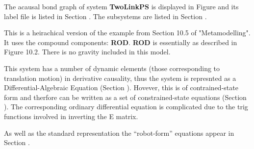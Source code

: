 
%

   The acausal bond graph of system \textbf{TwoLinkPS} is
   displayed in Figure  and its label
   file is listed in Section .
   The subsystems are listed in Section .

This is a heirachical version of the example from Section 10.5 of
"Metamodelling".  It uses the compound components: {\bf ROD}.  {\bf
ROD} is essentially as described in Figure 10.2.
There is no gravity included in this model.

This system has a number of dynamic elements (those corresponding to translation
motion) in derivative causality, thus the system is represnted as a
Differential-Algebraic Equation (Section
). Hovever, this is of contrained-state form and
therfore can be written as a set of constrained-state equations (Section
). The corresponding ordinary differential
equation is complicated due to the trig functions involved in
inverting the E matrix.

As well as the standard representation the ``robot-form'' equations
appear in Section  . 

